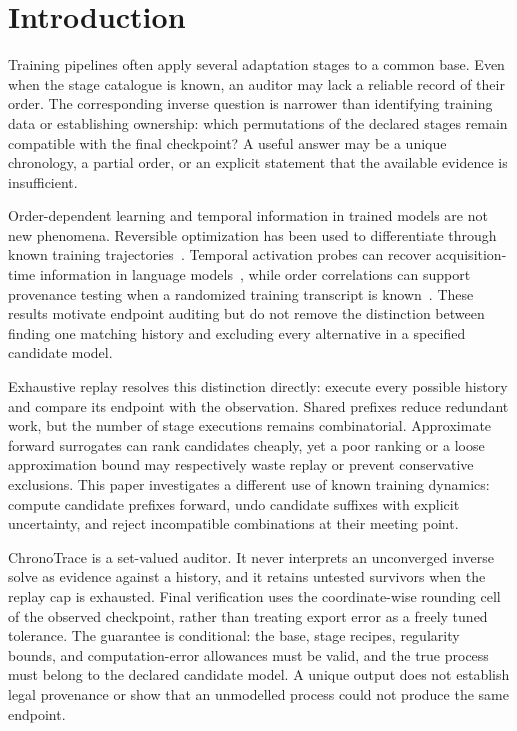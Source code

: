\section{Introduction}
Training pipelines often apply several adaptation stages to a common base. Even when the stage catalogue is known, an auditor may lack a reliable record of their order. The corresponding inverse question is narrower than identifying training data or establishing ownership: which permutations of the declared stages remain compatible with the final checkpoint? A useful answer may be a unique chronology, a partial order, or an explicit statement that the available evidence is insufficient.

Order-dependent learning and temporal information in trained models are not new phenomena. Reversible optimization has been used to differentiate through known training trajectories~\cite{maclaurin2015}. Temporal activation probes can recover acquisition-time information in language models~\cite{fresh2025}, while order correlations can support provenance testing when a randomized training transcript is known~\cite{palimpsest2025}. These results motivate endpoint auditing but do not remove the distinction between finding one matching history and excluding every alternative in a specified candidate model.

Exhaustive replay resolves this distinction directly: execute every possible history and compare its endpoint with the observation. Shared prefixes reduce redundant work, but the number of stage executions remains combinatorial. Approximate forward surrogates can rank candidates cheaply, yet a poor ranking or a loose approximation bound may respectively waste replay or prevent conservative exclusions. This paper investigates a different use of known training dynamics: compute candidate prefixes forward, undo candidate suffixes with explicit uncertainty, and reject incompatible combinations at their meeting point.

ChronoTrace is a set-valued auditor. It never interprets an unconverged inverse solve as evidence against a history, and it retains untested survivors when the replay cap is exhausted. Final verification uses the coordinate-wise rounding cell of the observed checkpoint, rather than treating export error as a freely tuned tolerance. The guarantee is conditional: the base, stage recipes, regularity bounds, and computation-error allowances must be valid, and the true process must belong to the declared candidate model. A unique output does not establish legal provenance or show that an unmodelled process could not produce the same endpoint.

